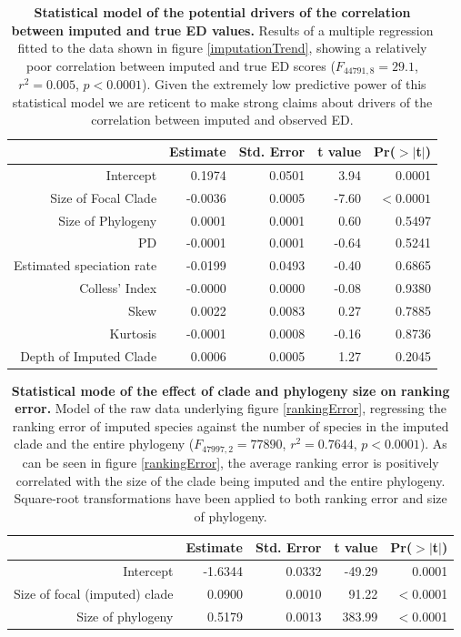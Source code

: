 \documentclass[10pt,english]{article}
\begin{document}
\begin{table}[ht] 
  \centering
  \begin{tabular}{rrrrr}
    \hline
    & Estimate & Std. Error & t value & Pr($>$$|$t$|$) \\
     \hline
     Intercept & 0.1974 & 0.0501 & 3.94 & 0.0001 \\
     Size of Focal Clade & -0.0036 & 0.0005 & -7.60 & $<0.0001$ \\
     Size of Phylogeny & 0.0001 & 0.0001 & 0.60 & 0.5497 \\
     PD & -0.0001 & 0.0001 & -0.64 & 0.5241 \\
     Estimated speciation rate & -0.0199 & 0.0493 & -0.40 & 0.6865 \\
     Colless' Index & -0.0000 & 0.0000 & -0.08 & 0.9380 \\
     Skew & 0.0022 & 0.0083 & 0.27 & 0.7885 \\
     Kurtosis & -0.0001 & 0.0008 & -0.16 & 0.8736 \\
     Depth of Imputed Clade & 0.0006 & 0.0005 & 1.27 & 0.2045 \\ \hline
  \end{tabular}
  \caption{\textbf{Statistical model of the potential drivers of the
      correlation between imputed and true ED values.} Results of a
    multiple regression fitted to the data shown in figure
    \ref{imputationTrend}, showing a relatively poor correlation between
    imputed and true ED scores ($F_{44791,8} = 29.1$, $r^{2} =
    0.005$, $p <
    0.0001$). Given the extremely low predictive power of this
    statistical model we are reticent to make strong claims about
    drivers of the correlation between imputed and observed ED.}
  \label{impute_reg}
\end{table}

\begin{table}[ht]
  \centering
  \begin{tabular}{rrrrr}
    \hline
   & Estimate & Std. Error & t value & Pr($>$$|$t$|$) \\ \hline
    Intercept & -1.6344 & 0.0332 & -49.29 & 0.0001 \\
    Size of focal (imputed) clade & 0.0900 & 0.0010 & 91.22 & $<$0.0001 \\
    Size of phylogeny & 0.5179 & 0.0013 & 383.99 & $<$0.0001 \\ \hline
  \end{tabular}
  \caption{\textbf{Statistical mode of the effect of clade and
      phylogeny size on ranking error.} Model of the raw data
    underlying figure \ref{rankingError}, regressing the ranking error
    of imputed species against the number of species in the imputed
    clade and the entire phylogeny ($F_{47997,2} = 77890$, $r^2 =
    0.7644$, $p <
    0.0001$). As can be seen in figure \ref{rankingError}, the average
    ranking error is positively correlated with the size of the clade
    being imputed and the entire phylogeny. Square-root
    transformations have been applied to both ranking error and size
    of phylogeny.}
  \label{impute_rank}
\end{table}
\end{document}
